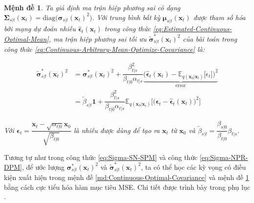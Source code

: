 \documentclass[14pt, a4paper]{article}
\numberwithin{equation}{section}
\numberwithin{figure}{section}
\newtheorem{md}{Mệnh đề}
\numberwithin{dl}{section}
\numberwithin{md}{section}
\numberwithin{bd}{section}
\numberwithin{dn}{section}
\numberwithin{hq}{section}
\begin{document}
    \begin{md} \label{md:Continuous-Corrected-Optimal-Covariance}
        Ta giả định ma trận hiệp phương sai có dạng $\boldsymbol{\Sigma}_{s \vert t} (\boldsymbol{x}_t) = \mathrm{diag} \big( \boldsymbol{\sigma}_{s \vert t} (\boldsymbol{x}_t)^2 \big)$.
        Với trung bình bất kỳ $\boldsymbol{\mu}_{s \vert t}(\boldsymbol{x}_t)$ được tham số hóa bởi mạng dự đoán nhiễu $\hat{\boldsymbol{\epsilon}}_t (\boldsymbol{x}_t)$ trong công thức \ref{eq:Estimated-Continuous-Optimal-Mean},
        ma trận hiệp phương sai tối ưu $\tilde{\boldsymbol{\sigma}}_{s \vert t}^{\ast} (\boldsymbol{x}_t)^2$ của bài toán trong công thức \ref{eq:Continuous-Arbitrary-Mean-Optimize-Covariance} là:

        \begin{equation}
            \begin{aligned}
                \tilde{\boldsymbol{\sigma}}_{s \vert t}^{\ast} (\boldsymbol{x}_t)^2 &= \boldsymbol{\sigma}_{s \vert t}^{\ast} (\boldsymbol{x}_t)^2 + \dfrac{\beta_{t \vert s}^2}{\beta_{t \vert 0} \alpha_{t \vert s}} \underbrace{\big( \hat{\boldsymbol{\epsilon}}_t (\boldsymbol{x}_t) - \mathbb{E}_{q(\boldsymbol{x}_0 \vert \boldsymbol{x}_t)} \lbrack \epsilon_t \rbrack \big)^2}_{\mathrm{error}} \\
                &= \tilde{\beta}_{s \vert t} \boldsymbol{1} + \dfrac{\beta_{t \vert s}^2}{\beta_{t \vert 0} \alpha_{t \vert s}} \mathbb{E}_{q(\boldsymbol{x}_0 \vert \boldsymbol{x}_t)} \big \lbrack \big( \boldsymbol{\epsilon}_t - \hat{\boldsymbol{\epsilon}}_t (\boldsymbol{x}_t) \big)^2 \big \rbrack
            \end{aligned}
        \end{equation}

        Với $\boldsymbol{\epsilon}_t = \dfrac{\boldsymbol{x}_t - \sqrt{\alpha_{t \vert 0}} \boldsymbol{x}_0}{\sqrt{\beta_{t \vert 0}}}$ là nhiễu được dùng để tạo ra $\boldsymbol{x}_t$ từ $\boldsymbol{x}_0$ và $\tilde{\beta}_{s \vert t} = \dfrac{\beta_{s \vert 0}}{\beta_{t \vert 0}} \beta_{t \vert s}$.
    \end{md}

    Tương tự như trong công thức \ref{eq:Sigma-SN-SPM} và công thức \ref{eq:Sigma-NPR-DPM},
    để ước lượng $\boldsymbol{\sigma}_{s \vert t}^{\ast} (\boldsymbol{x}_t)^2$ và $\tilde{\boldsymbol{\sigma}}_{s \vert t}^{\ast} (\boldsymbol{x}_t)^2$,
    ta có thể học các kỳ vọng có điều kiện xuất hiện trong mệnh đề \ref{md:Continuous-Optimal-Covariance} và mệnh đề \ref{md:Continuous-Corrected-Optimal-Covariance} bằng cách cực tiểu hóa hàm mục tiêu MSE.
    Chi tiết được trình bày trong phụ lục .
\end{document}
